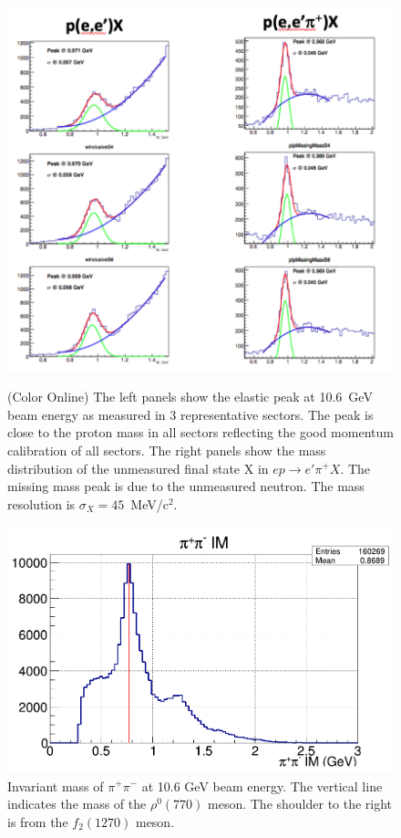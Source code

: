 \documentclass[final,3p,twocolumn]{elsarticle}
\begin{document}
\begin{figure}[t!]
\centerline{\includegraphics[width=1.0\columnwidth]{elastic_pi+n.png}}
\caption{(Color Online) The left panels show the elastic peak at 10.6~GeV beam energy as measured 
in 3 representative sectors. The
peak is close to the proton mass in all sectors reflecting the good momentum calibration of all sectors. 
The right panels show the mass distribution of the unmeasured final state X in
$ep \to e'\pi^+ X$. The missing mass peak is due to the unmeasured neutron. 
The mass resolution is $\sigma_X = 45$~MeV/c$^2$.} 
\label{elastic-peak}

\vspace{0.3cm}\centerline{\includegraphics[width=1.0\columnwidth]{rhoMass.png}}
\caption{Invariant mass of $\pi^+\pi^-$ at 10.6 GeV beam energy. The vertical line indicates the 
mass of the $\rho^0(770)$ meson. 
The shoulder to the right is from the $f_2(1270)$ meson.  }
\label{pip-pim-p}
\end{figure} 
\end{document}
